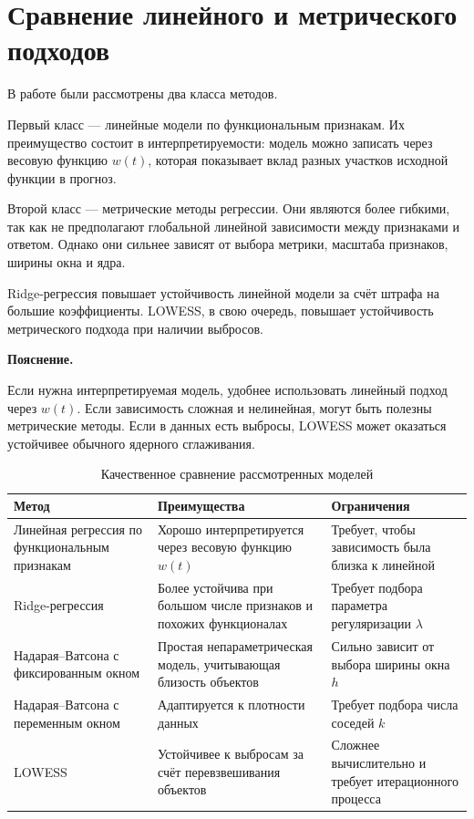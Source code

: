 \documentclass[14pt,a4paper]{extarticle}
\newenvironment{explanation}
{
    \vspace{0.2cm}
    \noindent\textbf{Пояснение.}
}
{
    \vspace{0.2cm}
}
\begin{document}
\section{Сравнение линейного и метрического подходов}

В работе были рассмотрены два класса методов.

Первый класс — линейные модели по функциональным признакам. Их преимущество состоит в интерпретируемости: модель можно записать через весовую функцию \(w(t)\), которая показывает вклад разных участков исходной функции в прогноз.

Второй класс — метрические методы регрессии. Они являются более гибкими, так как не предполагают глобальной линейной зависимости между признаками и ответом. Однако они сильнее зависят от выбора метрики, масштаба признаков, ширины окна и ядра.

Ridge-регрессия повышает устойчивость линейной модели за счёт штрафа на большие коэффициенты. LOWESS, в свою очередь, повышает устойчивость метрического подхода при наличии выбросов.

\begin{explanation}
Если нужна интерпретируемая модель, удобнее использовать линейный подход через \(w(t)\). Если зависимость сложная и нелинейная, могут быть полезны метрические методы. Если в данных есть выбросы, LOWESS может оказаться устойчивее обычного ядерного сглаживания.
\end{explanation}

\begin{table}[H]
\centering
\caption{Качественное сравнение рассмотренных моделей}
\begin{tabular}{|p{5.2cm}|p{4.3cm}|p{4.3cm}|}
\hline
\textbf{Метод} & \textbf{Преимущества} & \textbf{Ограничения} \\
\hline
Линейная регрессия по функциональным признакам 
& Хорошо интерпретируется через весовую функцию \(w(t)\) 
& Требует, чтобы зависимость была близка к линейной \\
\hline
Ridge-регрессия 
& Более устойчива при большом числе признаков и похожих функционалах 
& Требует подбора параметра регуляризации \(\lambda\) \\
\hline
Надарая--Ватсона с фиксированным окном 
& Простая непараметрическая модель, учитывающая близость объектов 
& Сильно зависит от выбора ширины окна \(h\) \\
\hline
Надарая--Ватсона с переменным окном 
& Адаптируется к плотности данных 
& Требует подбора числа соседей \(k\) \\
\hline
LOWESS 
& Устойчивее к выбросам за счёт перевзвешивания объектов 
& Сложнее вычислительно и требует итерационного процесса \\
\hline
\end{tabular}
\label{tab:qualitative_comparison}
\end{table}
\end{document}
